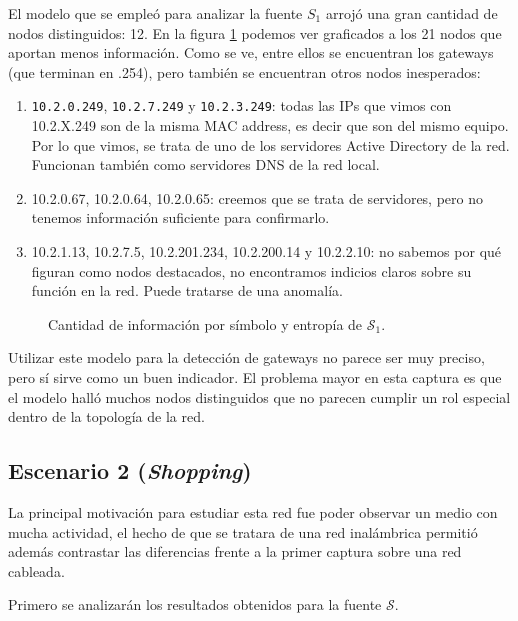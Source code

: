 El modelo que se empleó para analizar la fuente $S_1$ arrojó una gran cantidad de nodos distinguidos: 12. En la figura \ref{res:esc1:fig3} podemos ver graficados a los 21 nodos que aportan menos información. Como se ve, entre ellos se encuentran los gateways (que terminan en .254), pero también se encuentran otros nodos inesperados:

\begin{enumerate}
 \item \texttt{10.2.0.249}, \texttt{10.2.7.249} y \texttt{10.2.3.249}: todas las IPs que vimos con 10.2.X.249 son de la misma MAC address, es decir que son del mismo equipo. Por lo que vimos, se trata de uno de los servidores Active Directory de la red. Funcionan también como servidores DNS de la red local.
 \item 10.2.0.67, 10.2.0.64, 10.2.0.65: creemos que se trata de servidores, pero no tenemos información suficiente para confirmarlo.
 \item 10.2.1.13, 10.2.7.5, 10.2.201.234, 10.2.200.14 y 10.2.2.10: no sabemos por qué figuran como nodos destacados, no encontramos indicios claros sobre su función en la red. Puede tratarse de una anomalía.
\end{enumerate}

\begin{figure}[h]
	\caption{Cantidad de información por símbolo y entropía de $\mathcal{S}_1$.}
    \label{res:esc1:fig3}
\end{figure}


Utilizar este modelo para la detección de gateways no parece ser muy preciso, pero sí sirve como un buen indicador. El problema mayor en esta captura es que el modelo halló muchos nodos distinguidos que no parecen cumplir un rol especial dentro de la topología de la red.


\subsection{Escenario 2 (\emph{Shopping})}

La principal motivación para estudiar esta red fue poder observar un medio con
mucha actividad, el hecho de que se tratara de una red inalámbrica permitió además
contrastar las diferencias frente a la primer captura sobre una red cableada.

Primero se analizarán los resultados obtenidos para la fuente $\mathcal{S}$.

